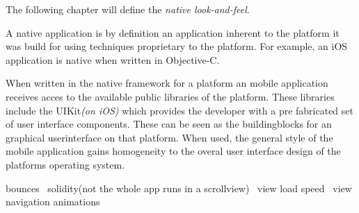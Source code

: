 The following chapter will define the \emph{native look-and-feel}.

A native application is by definition an application inherent to the platform it was build for using techniques proprietary to the platform. For example, an iOS application is native when written in Objective-C. 


When written in the native framework for a platform an mobile application receives acces to the available public libraries of the platform. These libraries include the UIKit\emph{(on iOS)} which provides the developer with a pre fabricated set of user interface components. These can be seen as the buildingblocks for an graphical userinterface on that platform. When used, the general style of the mobile application gains homogeneity to the overal user interface design of the platforms operating system. 

bounces \ solidity(not the whole app runs in a scrollview) \ view load speed \ view navigation animations \ 















